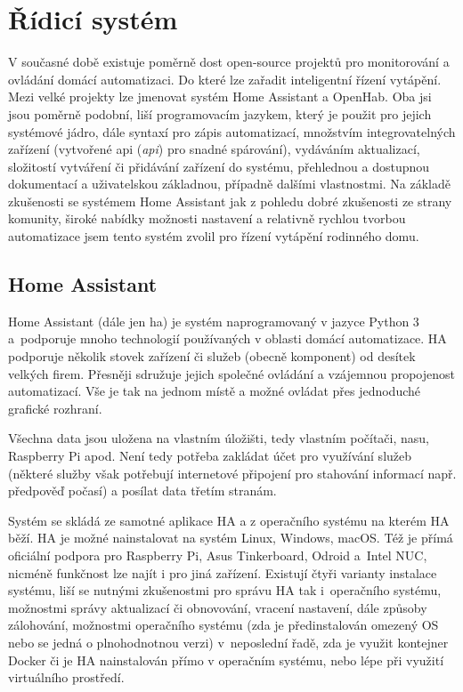 \section{Řídicí systém}
V současné době existuje poměrně dost open-source projektů pro monitorování a ovládání domácí automatizaci. Do které lze zařadit inteligentní řízení vytápění. Mezi velké projekty lze jmenovat systém Home Assistant a OpenHab. Oba jsi jsou poměrně podobní, liší programovacím jazykem, který je použit pro jejich systémové jádro, dále syntaxí pro zápis automatizací, množstvím integrovatelných zařízení (vytvořené \acrshort{api} (\textit{\acrlong{api}}) pro snadné spárování), vydáváním aktualizací, složitostí vytváření či přidávání zařízení do systému, přehlednou a dostupnou dokumentací a uživatelskou základnou, případně dalšími vlastnostmi. Na základě zkušenosti se systémem Home Assistant jak z pohledu dobré zkušenosti ze strany komunity, široké nabídky možnosti nastavení a relativně rychlou tvorbou automatizace jsem tento systém zvolil pro řízení vytápění rodinného domu.

\subsection{Home Assistant}
Home Assistant (dále jen \acrshort{ha}) je systém naprogramovaný v jazyce Python 3 a~podporuje mnoho technologií používaných v oblasti domácí automatizace. HA podporuje několik stovek zařízení či služeb (obecně komponent) od desítek velkých firem. Přesněji sdružuje jejich společné ovládání a vzájemnou propojenost automatizací. Vše je tak na jednom místě a možné ovládat přes jednoduché grafické rozhraní.

Všechna data jsou uložena na vlastním úložišti, tedy vlastním počítači, nasu, Raspberry Pi apod. Není tedy potřeba zakládat účet pro využívání služeb (některé služby však potřebují internetové připojení pro stahování informací např. předpověď počasí) a posílat data třetím stranám.

Systém se skládá ze samotné aplikace HA a z operačního systému na kterém HA běží. HA je možné nainstalovat na systém Linux, Windows, macOS. Též je přímá oficiální podpora pro Raspberry Pi, Asus Tinkerboard, Odroid a~Intel NUC, nicméně funkčnost lze najít i pro jiná zařízení. Existují čtyři varianty instalace systému, liší se nutnými zkušenostmi pro správu HA tak i~operačního systému, možnostmi správy aktualizací či obnovování, vracení nastavení, dále způsoby zálohování, možnostmi operačního systému (zda je předinstalován omezený OS nebo se jedná o plnohodnotnou verzi) v~neposlední řadě, zda je využit kontejner Docker či je HA nainstalován přímo v operačním systému, nebo lépe při využití virtuálního prostředí.

